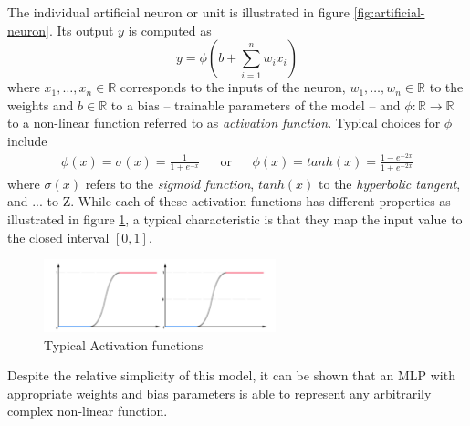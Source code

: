 The individual artificial neuron or unit is illustrated in figure \ref{fig:artificial-neuron}. Its output $y$ is computed as 
\begin{equation}
	y = \phi(b + \sum_{i=1}^{n} w_i x_i)
\end{equation}
where $x_1, \ldots, x_n \in \mathbb{R}$ corresponds to the inputs of the neuron, $w_1, \ldots, w_n\in \mathbb{R}$ to the weights and $b \in \mathbb{R}$ to a bias -- trainable parameters of the model -- and $\phi: \mathbb{R} \rightarrow \mathbb{R}$ to a non-linear function referred to as \emph{activation function}. Typical choices for $\phi$ include 
\begin{align*} 
\phi(x) = \sigma(x) = \frac{1}{1 + e^{-x}} && \text{or} && \phi(x) = tanh(x) = \frac{1  - e^{-2x}}{1  + e^{-2x}}
\end{align*} 
where $\sigma(x)$ refers to the \emph{sigmoid function}, $tanh(x)$ to the \emph{hyperbolic tangent}, and 
... to Z. While each of these activation functions has different properties as illustrated in figure \ref{fig:activation-functions}, a typical characteristic is that they map the input value to the closed interval $[0, 1]$. 

\begin{figure}[h]
	\caption{Typical Activation functions}\label{fig:activation-functions}   
	\centering
	\includegraphics[width=0.6\textwidth]{figures/chapter-2/activation-functions.png}
\end{figure}


%

Despite the relative simplicity of this model, it can be shown that an MLP with appropriate weights and bias parameters is able to represent any arbitrarily complex non-linear function.%


